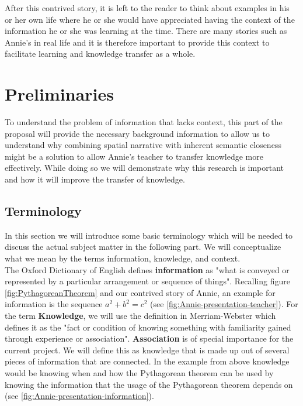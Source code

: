 \documentclass[twoside, 12pt]{article}
\begin{document}
After this contrived story, it is left to the reader to think about examples in his or her own life where he or she would have appreciated having the context of the information he or she was learning at the time. There are many stories such as Annie's in real life and it is therefore important to provide this context to facilitate learning and knowledge transfer as a whole. \\

\section{Preliminaries}
\label{sec:preliminaries}

To understand the problem of information that lacks context, this part of the proposal will provide the necessary background information to allow us to understand why combining spatial narrative with inherent semantic closeness might be a solution to allow Annie's teacher to transfer knowledge more effectively. While doing so we will demonstrate why this research is important and how it will improve the transfer of knowledge.\\

\subsection{Terminology}
\label{sec:terminology}

In this section we will introduce some basic terminology which will be needed to discuss the actual subject matter in the following part. We will conceptualize what we mean by the terms information, knowledge, and context.\\

The Oxford Dictionary of English \cite{OED:npentrel14} defines \textbf{information} as "what is conveyed or represented by a particular arrangement or sequence of things". Recalling figure \ref{fig:PythagoreanTheorem} and our contrived story of Annie, an example for information is the sequence \textit{$a^2 + b^2 = c^2$} (see \ref{fig:Annie-presentation-teacher}). For the term \textbf{Knowledge}, we will use the definition in Merriam-Webster \cite{Webster:npentrel14} which defines it as the "fact or condition of knowing something with familiarity gained through experience or association". \textbf{Association} is of special importance for the current project. We will define this as knowledge that is made up out of several pieces of information that are connected. In the example from above knowledge would be knowing when and how the Pythagorean theorem can be used by knowing the information that the usage of the Pythagorean theorem depends on (see \ref{fig:Annie-presentation-information}).\\ 
\end{document}
